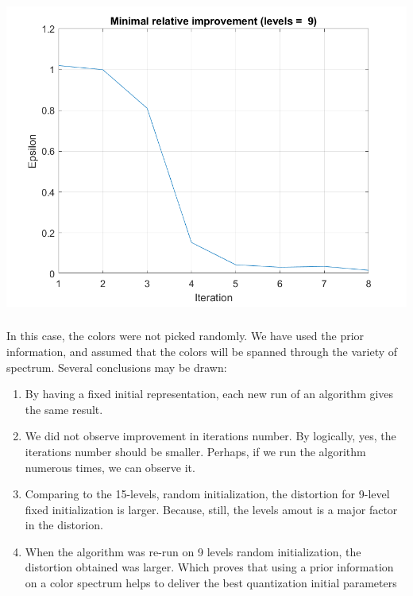\documentclass[a4paper]{iacas}
\begin{document}
\vskip 0.1in
\begin{minipage}{1\textwidth}
\centering
	\includegraphics[scale=0.9]{../imgs/imgs_q4/q4_epsilon_levels_9_init_2.png}
\end{minipage}
\vskip 0.1in

\subsubsection{}
In this case, the colors were not picked randomly. We have used the prior information, and assumed that the colors will be spanned through the variety of spectrum. Several conclusions may be drawn:

\begin{enumerate}
\item By having a fixed initial representation, each new run of an algorithm gives the same result.
\item We did not observe improvement in iterations number. By logically, yes, the iterations number should be smaller. Perhaps, if we run the algorithm numerous times, we can observe it.
\item Comparing to the 15-levels, random initialization, the distortion for 9-level fixed initialization is larger. Because, still, the levels amout is a major factor in the distorion.
\item When the algorithm was re-run on 9 levels random initialization, the distortion obtained was larger. Which proves that using a prior information on a color spectrum helps to deliver the best quantization initial parameters
\end{enumerate}
\end{document}
